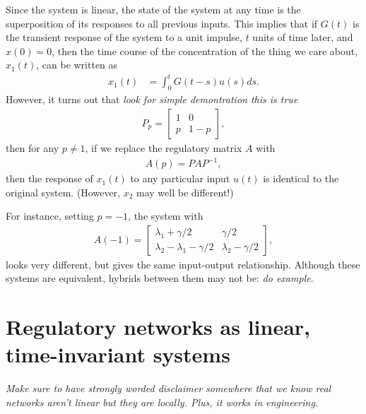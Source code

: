 \documentclass[11 pt]{article}
\newcommand{\plr}[1]{{\color{blue}\it #1}}
\begin{document}
Since the system is linear, the state of the system at any time
is the superposition of its responses to all previous inputs.
This implies that 
if $G(t)$ is the transient response of the system to a unit impulse,
$t$ units of time later,
and $x(0) = 0$,
then the time course of the concentration of the thing we care about, $x_1(t)$, 
can be written as
\begin{align} \label{eqn:ex_convolution}
    x_1(t) &= \int_0^t G(t-s) u(s) ds .
\end{align}
However, it turns out that 
\plr{look for simple demontration this is true}
\begin{align*}
    P_{p} = \left[\begin{matrix} 
        1 & 0 \\ 
        p & 1-p 
    \end{matrix}\right],
\end{align*}
then for any $p \neq 1$, 
if we replace the regulatory matrix $A$ with
\begin{align*}
    A(p) = P A P^{-1},
\end{align*}
then the response of $x_1(t)$ to any particular input $u(t)$ is identical to the original system.
(However, $x_2$ may well be different!)

For instance, setting $p=-1$,
the system with
\begin{align*}
    A(-1) = \left[\begin{matrix} 
        \lambda_1 + \gamma/2 & \gamma/2 \\ 
        \lambda_2-\lambda_1-\gamma/2 & \lambda_2 - \gamma/2
    \end{matrix}\right],
\end{align*}
looks very different, but gives the same input-output relationship.
Although these systems are equivalent,
hybrids between them may not be:
\plr{do example}.


\section{Regulatory networks as linear, time-invariant systems}

\plr{Make sure to have strongly worded disclaimer somewhere
that we know real networks aren't linear
but they are locally.
Plus, it works in engineering.}

\end{document}
